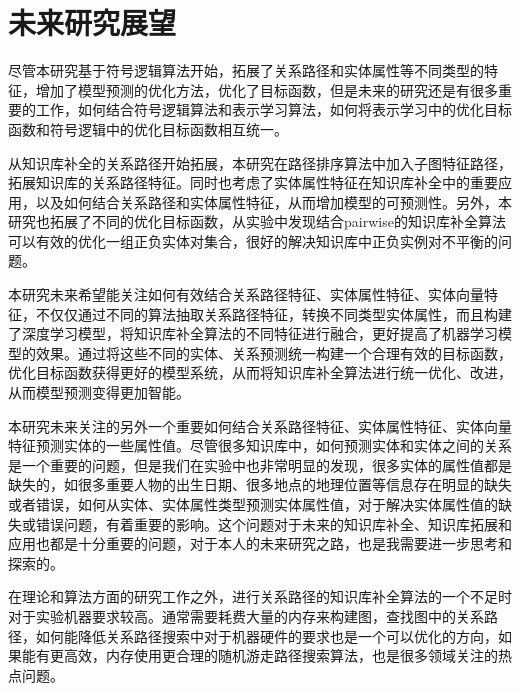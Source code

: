 \section{未来研究展望}
尽管本研究基于符号逻辑算法开始，拓展了关系路径和实体属性等不同类型的特征，增加了模型预测的优化方法，优化了目标函数，但是未来的研究还是有很多重要的工作，如何结合符号逻辑算法和表示学习算法，如何将表示学习中的优化目标函数和符号逻辑中的优化目标函数相互统一。

从知识库补全的关系路径开始拓展，本研究在路径排序算法中加入子图特征路径，拓展知识库的关系路径特征。同时也考虑了实体属性特征在知识库补全中的重要应用，以及如何结合关系路径和实体属性特征，从而增加模型的可预测性。另外，本研究也拓展了不同的优化目标函数，从实验中发现结合pairwise的知识库补全算法可以有效的优化一组正负实体对集合，很好的解决知识库中正负实例对不平衡的问题。

本研究未来希望能关注如何有效结合关系路径特征、实体属性特征、实体向量特征，不仅仅通过不同的算法抽取关系路径特征，转换不同类型实体属性，而且构建了深度学习模型，将知识库补全算法的不同特征进行融合，更好提高了机器学习模型的效果。通过将这些不同的实体、关系预测统一构建一个合理有效的目标函数，优化目标函数获得更好的模型系统，从而将知识库补全算法进行统一优化、改进，从而模型预测变得更加智能。

本研究未来关注的另外一个重要如何结合关系路径特征、实体属性特征、实体向量特征预测实体的一些属性值。尽管很多知识库中，如何预测实体和实体之间的关系是一个重要的问题，但是我们在实验中也非常明显的发现，很多实体的属性值都是缺失的，如很多重要人物的出生日期、很多地点的地理位置等信息存在明显的缺失或者错误，如何从实体、实体属性类型预测实体属性值，对于解决实体属性值的缺失或错误问题，有着重要的影响。这个问题对于未来的知识库补全、知识库拓展和应用也都是十分重要的问题，对于本人的未来研究之路，也是我需要进一步思考和探索的。

在理论和算法方面的研究工作之外，进行关系路径的知识库补全算法的一个不足时对于实验机器要求较高。通常需要耗费大量的内存来构建图，查找图中的关系路径，如何能降低关系路径搜索中对于机器硬件的要求也是一个可以优化的方向，如果能有更高效，内存使用更合理的随机游走路径搜索算法，也是很多领域关注的热点问题。